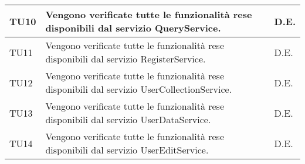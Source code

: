 \begin{center}
\begin{longtable}{|p{2cm}|p{7cm}|p{2cm}|}
\midrule
TU10
& Vengono verificate tutte le funzionalità rese disponibili dal servizio QueryService.
& D.E.\\


\midrule
TU11
& Vengono verificate tutte le funzionalità rese disponibili dal servizio RegisterService.
& D.E.\\


\midrule
TU12
& Vengono verificate tutte le funzionalità rese disponibili dal servizio UserCollectionService.
& D.E.\\

\midrule
TU13
& Vengono verificate tutte le funzionalità rese disponibili dal servizio UserDataService.
& D.E.\\

\midrule
TU14
& Vengono verificate tutte le funzionalità rese disponibili dal servizio UserEditService.
& D.E.\\



\end{longtable}
\end{center}

